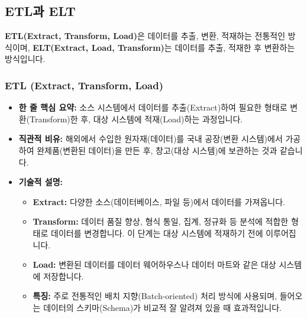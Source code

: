 \documentclass[11pt,a4paper]{article}
\begin{document}
\subsection{ETL과 ELT}

\begin{conceptbox}
\textbf{ETL(Extract, Transform, Load)}은 데이터를 추출, 변환, 적재하는 전통적인 방식이며,
\textbf{ELT(Extract, Load, Transform)}는 데이터를 추출, 적재한 후 변환하는 방식입니다.
\end{conceptbox}

\subsubsection{ETL (Extract, Transform, Load)}
\begin{itemize}
    \item \textbf{한 줄 핵심 요약:} 소스 시스템에서 데이터를 추출(Extract)하여 필요한 형태로 변환(Transform)한 후, 대상 시스템에 적재(Load)하는 과정입니다.
    \item \textbf{직관적 비유:} 해외에서 수입한 원자재(데이터)를 국내 공장(변환 시스템)에서 가공하여 완제품(변환된 데이터)을 만든 후, 창고(대상 시스템)에 보관하는 것과 같습니다.
    \item \textbf{기술적 설명:}
    \begin{itemize}
        \item \textbf{Extract:} 다양한 소스(데이터베이스, 파일 등)에서 데이터를 가져옵니다.
        \item \textbf{Transform:} 데이터 품질 향상, 형식 통일, 집계, 정규화 등 분석에 적합한 형태로 데이터를 변경합니다. 이 단계는 대상 시스템에 적재하기 전에 이루어집니다.
        \item \textbf{Load:} 변환된 데이터를 데이터 웨어하우스나 데이터 마트와 같은 대상 시스템에 저장합니다.
        \item \textbf{특징:} 주로 전통적인 배치 지향(Batch-oriented) 처리 방식에 사용되며, 들어오는 데이터의 스키마(Schema)가 비교적 잘 알려져 있을 때 효과적입니다.
    \end{itemize}
\end{itemize}
\end{document}
